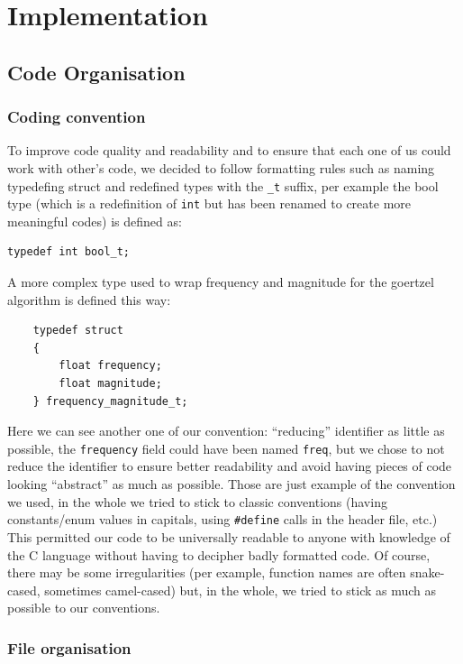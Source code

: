 \documentclass{cce2014-design}
\begin{document}


\section{Implementation}
\subsection{Code Organisation}


\subsubsection{Coding convention}
To improve code quality and readability and to ensure that each one of us could
work with other's code, we decided to follow formatting rules such as naming
typedefing struct and redefined types with the \texttt{\_t} suffix, per example
the bool type (which is a redefinition of \texttt{int} but has been renamed to
create more meaningful codes) is defined as:
\begin{verbatim}
typedef int bool_t;
\end{verbatim}
A more complex type used to wrap frequency and magnitude for the goertzel
algorithm is defined this way:
\begin{verbatim}
	typedef struct
	{
	    float frequency;
	    float magnitude;
	} frequency_magnitude_t;
\end{verbatim}
Here we can see another one of our convention: ``reducing'' identifier as
little as possible, the \texttt{frequency} field could have been named
\texttt{freq}, but we chose to not reduce the identifier to ensure better
readability and avoid having pieces of code looking ``abstract'' as much as
possible. Those are just example of the convention we used, in the whole we
tried to stick to classic conventions (having constants/enum values in capitals,
using \texttt{\#define} calls in the header file, etc.) This permitted our code
to be universally readable to anyone with knowledge of the C language without
having to decipher badly formatted code. Of course, there may be some
irregularities (per example, function names are often snake-cased, sometimes
camel-cased) but, in the whole, we tried to stick as much as possible to our
conventions.

\subsubsection{File organisation}
\end{document}
